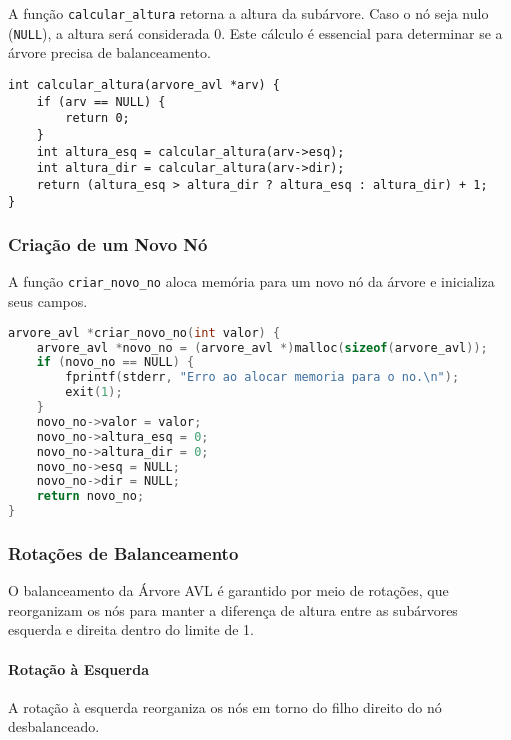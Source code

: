 A função \texttt{calcular\_altura} retorna a altura da subárvore. Caso o nó seja nulo (\texttt{NULL}), a altura será considerada 0. 
Este cálculo é essencial para determinar se a árvore precisa de balanceamento.

\begin{lstlisting}
int calcular_altura(arvore_avl *arv) {
    if (arv == NULL) {
        return 0;
    }
    int altura_esq = calcular_altura(arv->esq);
    int altura_dir = calcular_altura(arv->dir);
    return (altura_esq > altura_dir ? altura_esq : altura_dir) + 1;
}
\end{lstlisting}

\vspace{3mm}

\subsubsection{Criação de um Novo Nó}

\vspace{3mm}

A função \texttt{criar\_novo\_no} aloca memória para um novo nó da árvore e inicializa seus campos.

\begin{lstlisting}[language=C]
arvore_avl *criar_novo_no(int valor) {
    arvore_avl *novo_no = (arvore_avl *)malloc(sizeof(arvore_avl));
    if (novo_no == NULL) {
        fprintf(stderr, "Erro ao alocar memoria para o no.\n");
        exit(1);
    }
    novo_no->valor = valor;
    novo_no->altura_esq = 0;
    novo_no->altura_dir = 0;
    novo_no->esq = NULL;
    novo_no->dir = NULL;
    return novo_no;
}
\end{lstlisting}

\vspace{3mm}

\subsubsection{Rotações de Balanceamento}

\vspace{3mm}

O balanceamento da Árvore AVL é garantido por meio de rotações,
que reorganizam os nós para manter a diferença de altura entre as subárvores esquerda e direita dentro do limite de 1.

\paragraph{Rotação à Esquerda}  
A rotação à esquerda reorganiza os nós em torno do filho direito do nó desbalanceado.

